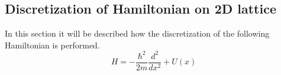 \subsection{Discretization of Hamiltonian on 2D lattice}
In this section it will be described how the discretization of the following Hamiltonian is performed.
\begin{equation}
  H = - \frac{\hbar^{2}}{2m}\frac{d^{2}}{dx^{2}} + U(x)
  \label{FreeHamiltonian}
\end{equation}
